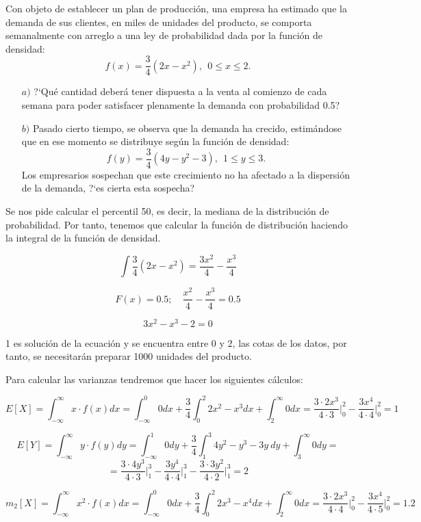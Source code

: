 \problem 

Con objeto de establecer un plan de producci{\'o}n,  una
empresa  ha estimado que la demanda de sus clientes, en miles de unidades del
producto,  se comporta  semanalmente  con arreglo a una ley de probabilidad
dada por la funci{\'o}n de densidad:
$$
f(x) =
\displaystyle{\frac{3}{4} (2x - x^{2})}, \  \ 0 \leq x \leq 2.
$$
\begin{enumerate}\item [$a)$] ?`Qu{\'e}  cantidad  deber{\'a} tener dispuesta a la venta al comienzo  de  cada  semana para poder
	satisfacer plenamente la demanda con probabilidad 0.5?
	\item [$b)$] Pasado cierto tiempo, se observa  que la demanda ha crecido,   estim{\'a}ndose que en
	ese momento se
	distribuye seg{\'u}n la  funci{\'o}n de densidad:
	$$
	f(y) =  \displaystyle{\frac{3}{4} (4y - y^{2}-3)},  \ \ 1 \leq y \leq 3.
	$$
	Los empresarios  sospechan que este crecimiento no ha afectado  a la dispersi{\'o}n
	de la demanda, ?`es cierta esta sospecha?
\end{enumerate}

\subproblem 
Se nos pide calcular el percentil 50, es decir, la mediana de la distribución de probabilidad. Por tanto, tenemos que calcular la función de distribución haciendo la integral de la función de densidad.

$$\int \dfrac{3}{4}(2x-x^2) = \dfrac{3x^2}{4} - \dfrac{x^3}{4}$$

$$F(x) = 0.5;\quad \dfrac{x^2}{4} - \dfrac{x^3}{4} = 0.5$$

$$3x^2 - x^3 - 2 = 0$$

1 es solución de la ecuación y se encuentra entre 0 y 2, las cotas de los datos, por tanto, se necesitarán preparar 1000 unidades del producto.

\subproblem 
Para calcular las varianzas tendremos que hacer los siguientes cálculos:

$$E[X] = \int_{-\infty}^{\infty} x\cdot f(x)dx = \int_{-\infty}^0 0dx + \dfrac{3}{4} \int_0^2 2x^2 - x^3dx + \int_2^{\infty} 0dx = \dfrac{3\cdot2x^3}{4\cdot3} \biggr\rvert_0^2 - \dfrac{3x^4}{4\cdot4}\biggr\rvert_0^2 = 1$$

$$E[Y] = \int_{-\infty}^{\infty} y\cdot f(y)dy = \int_{-\infty}^1 0dy + \dfrac{3}{4} \int_1^3 4y^2 - y^3 -3y\ dy + \int_3^{\infty} 0dy = $$ 
$$= \dfrac{3\cdot4y^3}{4\cdot3} \biggr\rvert_1^3 - \dfrac{3y^4}{4\cdot4}\biggr\rvert_1^3 - \dfrac{3\cdot3y^2}{4\cdot2}\biggr\rvert_1^3= 2$$


$$m_2[X] = \int_{-\infty}^{\infty} x^2\cdot f(x)dx = \int_{-\infty}^0 0dx + \dfrac{3}{4} \int_0^2 2x^3 - x^4dx + \int_2^{\infty} 0dx = \dfrac{3\cdot2x^3}{4\cdot4} \biggr\rvert_0^2 - \dfrac{3x^4}{4\cdot5}\biggr\rvert_0^2 = 1.2$$


